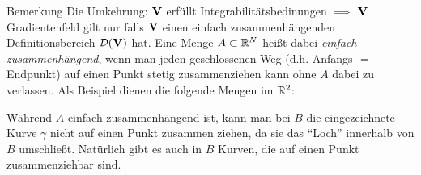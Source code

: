 \documentclass{scrartcl}
\newcommand{\DD}{\mathcal{D}}
\begin{document}
\begin{remark}{Bemerkung}
  Die Umkehrung: $\mathbf{V}$ erfüllt Integrabilitätsbedinungen $\implies$ $\mathbf{V}$ Gradientenfeld gilt nur falls $\mathbf{V}$ einen einfach zusammenhängenden Definitionsbereich $\DD(\mat V)$ hat.
  Eine Menge $A \subset \mathbb{R}^N$ heißt dabei \emph{einfach zusammenhängend}, wenn man jeden geschlossenen Weg (d.h. Anfangs- = Endpunkt) auf einen Punkt stetig zusammenziehen kann ohne $A$ dabei zu verlassen. Als Beispiel dienen die folgende Mengen im $\mathbb{R}^2$:

  \begin{center}
  \end{center}
  Während $A$ einfach zusammenhängend ist, kann man bei $B$ die eingezeichnete Kurve $\gamma$ nicht auf einen Punkt zusammen ziehen, da sie das ``Loch'' innerhalb von $B$ umschließt. 
  Natürlich gibt es auch in $B$ Kurven, die auf einen Punkt zusammenziehbar sind.
\end{remark}
\end{document}
